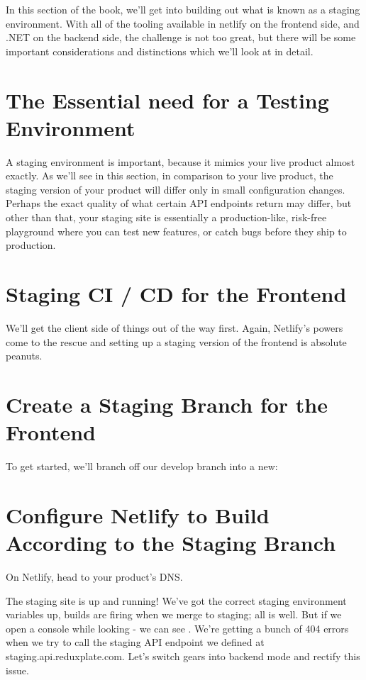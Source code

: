 \documentclass[paper=6in:9in,pagesize=pdftex,headinclude=on,footinclude=on,12pt,twoside]{scrbook}
\begin{document}
In this section of the book, we'll get into building out what is known as a staging environment. With all of the tooling available in netlify on the frontend side, and .NET on the backend side, the challenge is not too great, but there will be some important considerations and distinctions which we'll look at in detail.

\section{The Essential need for a Testing Environment}

A staging environment is important, because it mimics your live product almost exactly. As we'll see in this section, in comparison to your live product, the staging version of your product will differ only in small configuration changes. Perhaps the exact quality of what certain API endpoints return may differ, but other than that, your staging site is essentially a production-like, risk-free playground where you can test new features, or catch bugs before they ship to production.

\section{Staging CI / CD for the Frontend}

We'll get the client side of things out of the way first. Again, Netlify's powers come to the rescue and setting up a staging version of the frontend is absolute peanuts. 

\section{Create a Staging Branch for the Frontend}

To get started, we'll branch off our develop branch into a new:

\section{Configure Netlify to Build According to the Staging Branch}

On Netlify, head to your product's DNS.

The staging site is up and running! We've got the correct staging environment variables up, builds are firing when we merge to staging; all is well. But if we open a console while looking - we can see . We're getting a bunch of 404 errors when we try to call the staging API endpoint we defined at staging.api.reduxplate.com. Let's switch gears into backend mode and rectify this issue.
\end{document}
